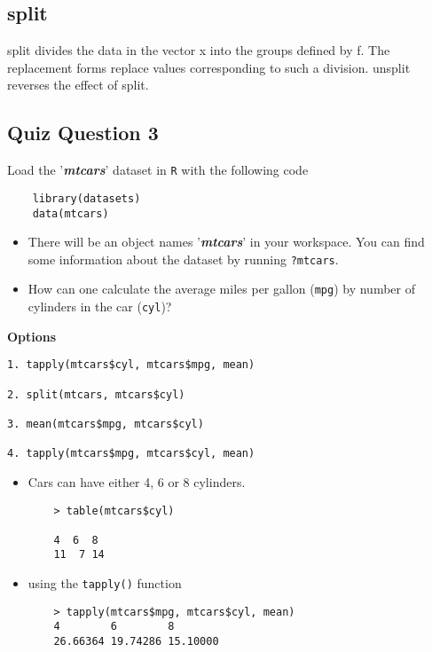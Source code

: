 \documentclass[12pt]{article}
\begin{document}

\newpage
\subsection*{split}
split divides the data in the vector x into the groups defined by f. The replacement forms replace values corresponding to such a division. unsplit reverses the effect of split.

\newpage

\subsection*{Quiz Question 3}
Load the '\textit{\textbf{mtcars}}' dataset in \texttt{R} with the following code

\begin{framed}
	\begin{verbatim}
	library(datasets)
	data(mtcars)
	\end{verbatim}
\end{framed}

\begin{itemize}
	\item There will be an object names '\textit{\textbf{mtcars}}' in your workspace. You can find some information about the dataset by running
	\texttt{?mtcars}.
	
	\item How can one calculate the average miles per gallon (\texttt{mpg}) by number of cylinders in the car (\texttt{cyl})?
\end{itemize}
\textbf{Options}
\begin{framed}
\begin{verbatim}
1. tapply(mtcars$cyl, mtcars$mpg, mean)

2. split(mtcars, mtcars$cyl)

3. mean(mtcars$mpg, mtcars$cyl)

4. tapply(mtcars$mpg, mtcars$cyl, mean)
\end{verbatim}
\end{framed}
\begin{itemize}
	\item Cars can have either 4, 6 or 8 cylinders.
	\begin{verbatim}
	> table(mtcars$cyl)
	
	4  6  8 
	11  7 14 
	\end{verbatim}
	\item using the \texttt{tapply()} function
	\begin{verbatim}
	> tapply(mtcars$mpg, mtcars$cyl, mean)
	4        6        8 
	26.66364 19.74286 15.10000
	\end{verbatim}
\end{itemize}
\newpage
\end{document}
